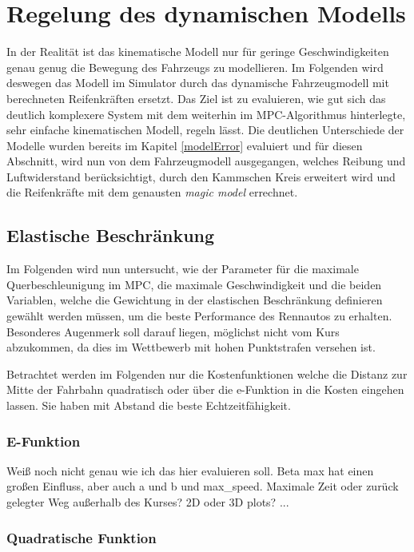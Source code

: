 \documentclass{like}
\begin{document}
\newpage
\chapter{Regelung des dynamischen Modells}
\label{dynModelcontrol}
In der Realität ist das kinematische Modell nur für geringe Geschwindigkeiten genau genug die Bewegung des Fahrzeugs zu modellieren. Im Folgenden wird deswegen das Modell im Simulator durch das dynamische Fahrzeugmodell mit berechneten Reifenkräften ersetzt. Das Ziel ist zu evaluieren, wie gut sich das deutlich komplexere System mit dem weiterhin im \ac{MPC}-Algorithmus hinterlegte, sehr einfache kinematischen Modell, regeln lässt.
Die deutlichen Unterschiede der Modelle wurden bereits im Kapitel \ref{modelError} evaluiert und für diesen Abschnitt, wird nun von dem Fahrzeugmodell ausgegangen, welches Reibung und Luftwiderstand berücksichtigt, durch den Kammschen Kreis erweitert wird und die Reifenkräfte mit dem genausten \emph{magic model} errechnet.

\section{Elastische Beschränkung}
Im Folgenden wird nun untersucht, wie der Parameter für die maximale Querbeschleunigung im \ac{MPC}, die maximale Geschwindigkeit und die beiden Variablen, welche die Gewichtung in der elastischen Beschränkung definieren gewählt werden müssen, um die beste Performance des Rennautos zu erhalten. Besonderes Augenmerk soll darauf liegen, möglichst nicht vom Kurs abzukommen, da dies im Wettbewerb mit hohen Punktstrafen versehen ist.

Betrachtet werden im Folgenden nur die Kostenfunktionen welche die Distanz zur Mitte der Fahrbahn quadratisch oder über die e-Funktion in die Kosten eingehen lassen. Sie haben mit Abstand die beste Echtzeitfähigkeit.

\subsection{E-Funktion}
Weiß noch nicht genau wie ich das hier evaluieren soll. Beta max hat einen großen Einfluss, aber auch a und b und max_speed. Maximale Zeit oder zurück gelegter Weg außerhalb des Kurses? 2D oder 3D plots? ... 

\subsection{Quadratische Funktion}
\end{document}
